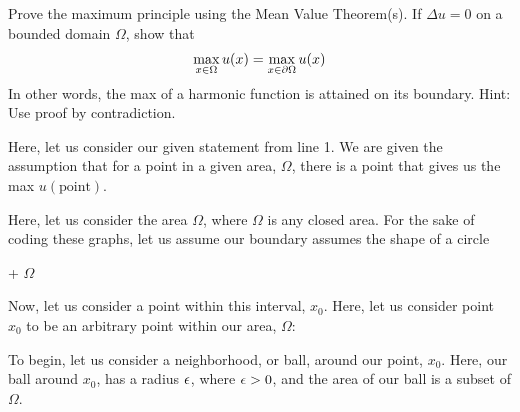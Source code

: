 \item Prove the maximum principle using the Mean Value Theorem(s). If $\Delta u = 0$ on a bounded domain $\Omega$, show that
%
\begin{align}
  \max_{x \in \Omega} u(x) = \max_{x \in \partial \Omega} u(x)
\end{align}
In other words, the max of a harmonic function is attained on its boundary. Hint: Use proof by contradiction.
\bigbreak

Here, let us consider our given statement from line 1. We are given the assumption that for a point in a given area, $\Omega$, there is a point that gives us the max $u(\text{point})$.

Here, let us consider the area $\Omega$, where $\Omega$ is any closed area.
For the sake of coding these graphs, let us assume our boundary assumes the shape of a circle %

\begin{center}
  + $\Omega$ %
\end{center}

Now, let us consider a point within this interval, $x_0$. Here, let us consider point $x_0$ to be an arbitrary point within our area, $\Omega$:

\begin{center}
\end{center}

To begin, let us consider a neighborhood, or ball, around our point, $x_0$. Here, our ball around $x_0$, has a radius $\epsilon$, where $\epsilon > 0$, and the area of our ball is a subset of $\Omega$.

\begin{center}
\end{center}

